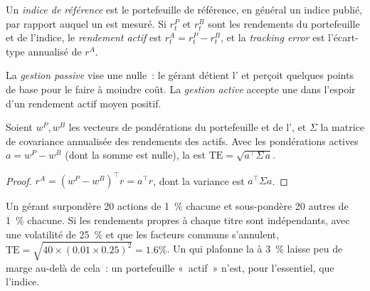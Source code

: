 \begin{definition}\label{def:m1:the-buy-side:benchmark}
Un \emph{indice de référence} est le portefeuille de référence, en général un
indice publié, par rapport auquel un  est mesuré. Si $r^P_t$ et $r^B_t$
sont les rendements du portefeuille et de l'indice, le \emph{rendement actif}
est $r^A_t = r^P_t - r^B_t$, et la
\emph{tracking error} est l'écart-type annualisé
de $r^A$.
\end{definition}

\begin{definition}\label{def:m1:the-buy-side:passive}
La \emph{gestion passive} vise une 
nulle~: le gérant détient l' et perçoit quelques points de base pour
le faire à moindre coût. La \emph{gestion active} accepte
une  dans l'espoir d'un rendement actif moyen positif.
\end{definition}

\begin{proposition}\label{prop:m1:the-buy-side:te}
Soient $w^P, w^B$ les vecteurs de pondérations du portefeuille et de l', et $\Sigma$
la matrice de covariance annualisée des rendements des actifs. Avec les pondérations actives
$a = w^P - w^B$ (dont la somme est nulle), la  est
$\mathrm{TE} = \sqrt{a^\top \Sigma\, a}$.
\end{proposition}
\begin{proof}
$r^A = (w^P - w^B)^\top r = a^\top r$, dont la variance est $a^\top\Sigma a$.
\end{proof}

\begin{example}\label{ex:m1:the-buy-side:bets}
Un gérant surpondère 20 actions de 1~\% chacune et sous-pondère 20 autres
de 1~\% chacune. Si les rendements propres à chaque titre sont indépendants, avec une volatilité de 25~\%
et que les facteurs communs s'annulent, $\mathrm{TE} = \sqrt{40 \times (0.01 \times
0.25)^2} = 1.6\%$. Un  qui plafonne la  à 3~\% laisse
peu de marge au-delà de cela~: un portefeuille «~actif~» n'est, pour l'essentiel, que l'indice.
\end{example}

